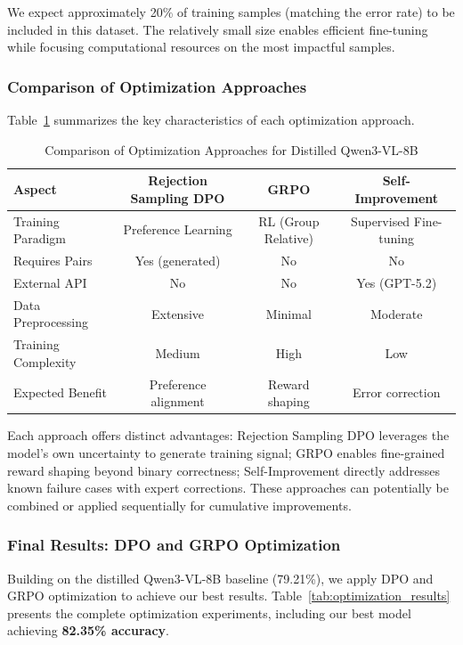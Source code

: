 \documentclass[11pt,a4paper]{article}
\begin{document}
We expect approximately 20\% of training samples (matching the error rate) to be included in this dataset. The relatively small size enables efficient fine-tuning while focusing computational resources on the most impactful samples.

\subsubsection{Comparison of Optimization Approaches}

Table~\ref{tab:optimization_comparison} summarizes the key characteristics of each optimization approach.

\begin{table}[h]
\centering
\caption{Comparison of Optimization Approaches for Distilled Qwen3-VL-8B}
\label{tab:optimization_comparison}
\begin{tabular}{lccc}
\toprule
\textbf{Aspect} & \textbf{Rejection Sampling DPO} & \textbf{GRPO} & \textbf{Self-Improvement} \\
\midrule
Training Paradigm & Preference Learning & RL (Group Relative) & Supervised Fine-tuning \\
Requires Pairs & Yes (generated) & No & No \\
External API & No & No & Yes (GPT-5.2) \\
Data Preprocessing & Extensive & Minimal & Moderate \\
Training Complexity & Medium & High & Low \\
Expected Benefit & Preference alignment & Reward shaping & Error correction \\
\bottomrule
\end{tabular}
\end{table}

Each approach offers distinct advantages: Rejection Sampling DPO leverages the model's own uncertainty to generate training signal; GRPO enables fine-grained reward shaping beyond binary correctness; Self-Improvement directly addresses known failure cases with expert corrections. These approaches can potentially be combined or applied sequentially for cumulative improvements.


\subsubsection{Final Results: DPO and GRPO Optimization}

Building on the distilled Qwen3-VL-8B baseline (79.21\%), we apply DPO and GRPO optimization to achieve our best results. Table~\ref{tab:optimization_results} presents the complete optimization experiments, including our best model achieving \textbf{82.35\% accuracy}.
\end{document}
